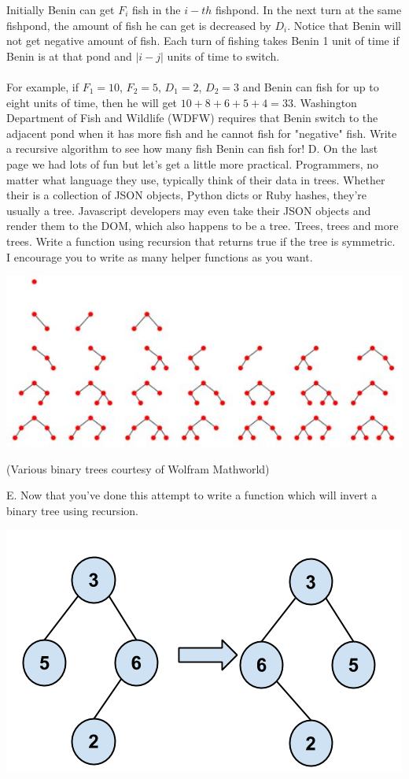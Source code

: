 \documentclass[12pt]{article}
\begin{document}
Initially Benin can get $F_i$ fish in the $i-th$ fishpond. 
In the next turn at the same fishpond, the amount of fish he can get is decreased by $D_i$. 
Notice that Benin will not get negative amount of fish.
Each turn of fishing takes Benin 1 unit of time if Benin is at that pond and $|i - j|$ units of time to switch.
\\\\
For example, if $F_1 = 10$, $F_2 = 5$, $D_1 = 2$, $D_2 = 3$ and Benin can fish for up to eight units of time, then he will get $10 + 8 + 6 + 5 + 4 = 33$.
Washington Department of Fish and Wildlife (WDFW) requires that Benin switch to the adjacent pond when it has more fish and he cannot fish for "negative" fish.
Write a recursive algorithm to see how many fish Benin can fish for!
\newpage
\noindent D. On the last page we had lots of fun but let's get a little more practical. Programmers, no matter what language they use, typically think of their data in trees. Whether their is a collection of JSON objects, Python dicts or Ruby hashes, they're usually a tree. Javascript developers may even take their JSON objects and render them to the DOM, which also happens to be a tree. Trees, trees and more trees. Write a function using recursion that returns true if the tree is symmetric. I encourage you to write as many helper functions as you want.\\
\centerline{\includegraphics[scale = 0.5]{binarytree.jpg}}
\centerline{(Various binary trees courtesy of Wolfram Mathworld)}
\newpage
\noindent E. Now that you've done this attempt to write a function which will invert a binary tree using recursion.\\
\centerline{\includegraphics[scale = 0.4]{invertbtree.png}}
\end{document}

